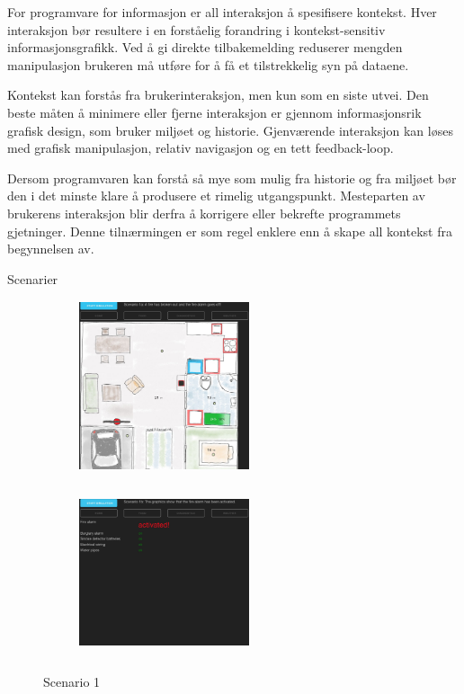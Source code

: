 For programvare for informasjon er all interaksjon å spesifisere kontekst. Hver interaksjon bør resultere i en forståelig forandring i kontekst-sensitiv informasjonsgrafikk. Ved å gi direkte tilbakemelding reduserer mengden manipulasjon brukeren må utføre for å få et tilstrekkelig syn på dataene.

Kontekst kan forstås fra brukerinteraksjon, men kun som en siste utvei. Den beste måten å minimere eller fjerne interaksjon er gjennom informasjonsrik grafisk design, som bruker miljøet og historie. Gjenværende interaksjon kan løses med grafisk manipulasjon, relativ navigasjon og en tett feedback-loop.

Dersom programvaren kan forstå så mye som mulig fra historie og fra miljøet bør den i det minste klare å produsere et rimelig utgangspunkt. Mesteparten av brukerens interaksjon blir derfra å korrigere eller bekrefte programmets gjetninger. Denne tilnærmingen er som regel enklere enn å skape all kontekst fra begynnelsen av.

{\color{red}Scenarier}
\begin{figure}[ht]
\centering
\begin{subfigure}{0.32\textwidth}
\centering
\includegraphics[width=5cm, height=5cm]{fig/scenario1a}
\caption{}
\label{fig:1a}
\end{subfigure}
\begin{subfigure}{0.32\textwidth}
\centering
\includegraphics[width=5cm, height=5cm]{fig/scenario1b}
\caption{}
\label{fig:1b}
\end{subfigure}
\caption{Scenario 1}
\label{fig:scenario1}
\end{figure}

